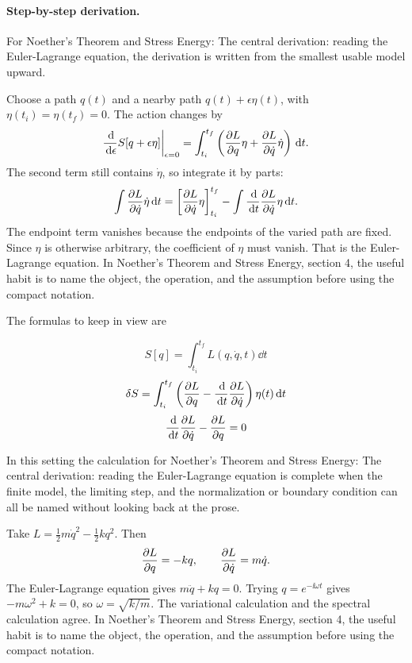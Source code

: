 \paragraph{Step-by-step derivation.}

For Noether's Theorem and Stress Energy: The central derivation: reading the Euler-Lagrange equation, the derivation is written from the smallest usable model upward.

Choose a path \(q(t)\) and a nearby path \(q(t)+\epsilon\eta(t)\), with \(\eta(t_i)=\eta(t_f)=0\).  The action changes by
\[
  \frac{\,\mathrm d}{\,\mathrm d\epsilon}S[q+\epsilon\eta]\bigg|_{\epsilon=0}
  =
  \int_{t_i}^{t_f}
  \left(
  \frac{\partial L}{\partial q}\eta+\frac{\partial L}{\partial\dot q}\dot\eta
  \right)\,\mathrm d t.
\]
The second term still contains \(\dot\eta\), so integrate it by parts:
\[
  \int \frac{\partial L}{\partial\dot q}\dot\eta\,\mathrm d t
  =
  \left[\frac{\partial L}{\partial\dot q}\eta\right]_{t_i}^{t_f}
  -
  \int \frac{\,\mathrm d}{\,\mathrm d t}\frac{\partial L}{\partial\dot q}\eta\,\mathrm d t.
\]
The endpoint term vanishes because the endpoints of the varied path are fixed.  Since \(\eta\) is otherwise arbitrary, the coefficient of \(\eta\) must vanish.  That is the Euler-Lagrange equation.  In Noether's Theorem and Stress Energy, section 4, the useful habit is to name the object, the operation, and the assumption before using the compact notation.

The formulas to keep in view are

\[
  S[q]=\int_{t_i}^{t_f}L(q,\dot q,t)\dd t
\]
\[
  \delta S=\int_{t_i}^{t_f}\left(\frac{\partial L}{\partial q}-\frac{\,\mathrm d}{\,\mathrm d t}\frac{\partial L}{\partial\dot q}\right)\eta(t)\,\mathrm d t
\]
\[
  \frac{\,\mathrm d}{\,\mathrm d t}\frac{\partial L}{\partial\dot q}-\frac{\partial L}{\partial q}=0
\]

In this setting the calculation for Noether's Theorem and Stress Energy: The central derivation: reading the Euler-Lagrange equation is complete when the finite model, the limiting step, and the normalization or boundary condition can all be named without looking back at the prose.




\begin{example}
Take \(L=\frac12m\dot q^2-\frac12kq^2\).  Then
\[
  \frac{\partial L}{\partial q}=-kq,\qquad \frac{\partial L}{\partial\dot q}=m\dot q.
\]
The Euler-Lagrange equation gives \(m\ddot q+kq=0\).  Trying \(q=e^{-\ii\omega t}\) gives \(-m\omega^2+k=0\), so \(\omega=\sqrt{k/m}\).  The variational calculation and the spectral calculation agree.  In Noether's Theorem and Stress Energy, section 4, the useful habit is to name the object, the operation, and the assumption before using the compact notation.
\end{example}



